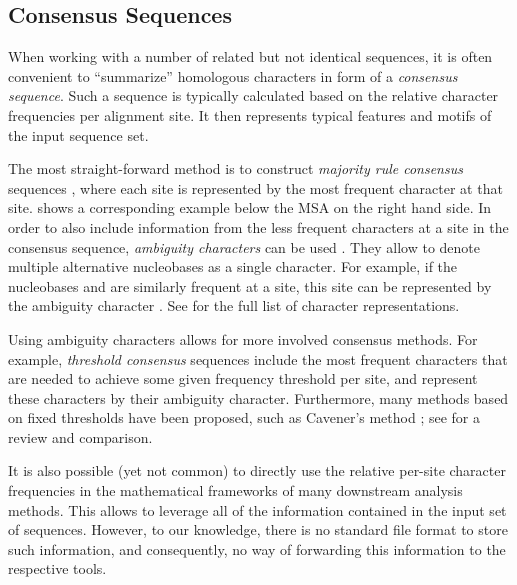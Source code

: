 
\subsection{Consensus Sequences}
\label{ch:Foundations:sec:SequenceAnalysis:sub:ConsensusSequences}

When working with a number of related but not identical sequences,
it is often convenient to ``summarize'' homologous characters in form of a \emph{consensus sequence}.
Such a sequence is typically calculated based on the relative character frequencies per alignment site.
It then represents typical features and motifs of the input sequence set.

The most straight-forward method is to construct \emph{majority rule consensus} sequences \cite{May1952,Day1992a},
where each site is represented by the most frequent character at that site.
 shows a corresponding example below the MSA on the right hand side.
In order to also include information from the less frequent characters at a site in the consensus sequence,
\emph{ambiguity characters} can be used \cite{IUPAC1970}.
They allow to denote multiple alternative nucleobases as a single character.
For example, if the nucleobases  and  are similarly frequent at a site,
this site can be represented by the ambiguity character .
See  for the full list of character representations.

Using ambiguity characters allows for more involved consensus methods.
For example, \emph{threshold consensus} sequences \cite{Day1992a,Day1992} include the most frequent characters
that are needed to achieve some given frequency threshold per site,
and represent these characters by their ambiguity character.
Furthermore, many methods based on fixed thresholds have been proposed,
such as Cavener's method \cite{Cavener1987,Cavener1991a};
see  for a review and comparison.

It is also possible (yet not common) to directly use the relative per-site character frequencies
in the mathematical frameworks of many downstream analysis methods.
This allows to leverage all of the information contained in the input set of sequences.
However, to our knowledge, there is no standard file format to store such information,
and consequently, no way of forwarding this information to the respective tools.

